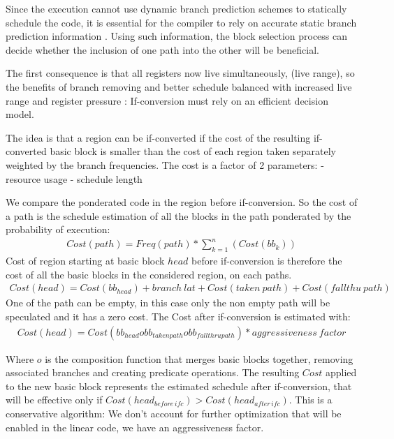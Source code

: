 Since the execution cannot use dynamic branch prediction schemes to statically schedule the code, it is essential for the compiler to rely on accurate static branch prediction information \cite{Fisher:1992:PCB:143371.143493}. Using such information, the block selection process can decide whether the inclusion of one path into the other will be beneficial. 

The first consequence is that all registers now live simultaneously, (live range), so the benefits of branch removing and better schedule balanced with increased live range and register pressure : If-conversion must rely on an efficient decision model.

The idea is that a region can be if-converted if the cost of the resulting if-converted basic block is smaller than the cost of each region taken separately weighted by the branch frequencies. The cost is a factor of 2 parameters:
- resource usage
- schedule length

We compare the ponderated code in the region before if-conversion. So the cost of a path is the schedule estimation of all the blocks in the path ponderated by the probability of execution:
\begin{align}
Cost(path)=Freq(path)*\sum_{k=1}^n(Cost(bb_{k}))
\end{align}
Cost of region starting at basic block $head$ before if-conversion is therefore the cost of all the basic blocks in the considered region, on each paths.
\begin{align}
Cost(head)=Cost(bb_{head})+branch\:lat+Cost(taken\:path)+Cost(fallthu\:path)
\end{align}
One of the path can be empty, in this case only the non empty path will be speculated and it has a zero cost. The Cost after if-conversion is estimated with:
\begin{align}
Cost(head)=Cost(bb_{head} o bb_{taken path} o bb_{fallthru path}) * aggressiveness\:factor
\end{align}

Where $o$ is the composition function that merges basic blocks together, removing associated branches and creating predicate operations. The resulting $Cost$ applied to the new basic block represents the estimated schedule after if-conversion, that will be effective only if $Cost(head_{before\,ifc}) > Cost(head_{after\,ifc})$. This is a conservative algorithm: We don't account for further optimization that will be enabled in the linear code, we have an aggressiveness factor. 
 
